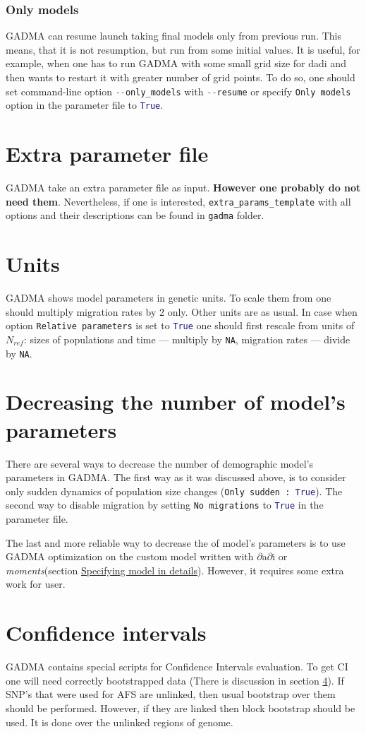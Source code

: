 \documentclass[12pt]{article}
\makeatletter
\newcommand{\dadi}{$\partial$a$\partial$i\xspace}
\newcommand{\moments}{\textit{moments}\xspace}
\newcommand{\py}[1]{\lstinline[language=Python, showstringspaces=False]@#1@}
\makeatother
\begin{document}
\subsubsection{Only models}
GADMA can resume launch taking final models only from previous run. This means, that it is not resumption, but run from some initial values. It is useful, for example, when one has to run GADMA with some small grid size for dadi and then wants to restart it with greater number of grid points. To do so, one should set command-line option \py{--only_models} with \py{--resume} or specify \py{Only models} option in the parameter file to \py{True}.

\section{Extra parameter file}
GADMA take an extra parameter file as input. \textbf{However one probably do not need them}. Nevertheless, if one is interested, \py{extra_params_template} with all options and their descriptions can be found in \py{gadma} folder.

\section{Units}
GADMA shows model parameters in genetic units. To scale them from one should multiply migration rates by 2 only. Other units are as usual. In case when option \py{Relative parameters} is set to \py{True} one should first rescale from units of $N_{ref}$: sizes of populations and time --- multiply by \py{NA}, migration rates --- divide by \py{NA}.

\section{Decreasing the number of model's parameters}
There are several ways to decrease the number of demographic model's parameters in GADMA. The first way as it was discussed above, is to consider only sudden dynamics of population size changes (\py{Only sudden : True}). The second way to disable migration by setting \py{No migrations} to \py{True} in the parameter file.

The last and more reliable way to decrease the of model's parameters is to use GADMA optimization on the custom model written with \dadi or \moments (section \hyperref[sec:spec-model-in-det]{Specifying model in details}). However, it requires some extra work for user.

\section{Confidence intervals}
GADMA contains special scripts for Confidence Intervals evaluation. To get CI one will need correctly bootstrapped data (There is discussion in section \ref{}). If SNP's that were used for AFS are unlinked, then usual bootstrap over them should be performed. However, if they are linked then block bootstrap should be used. It is done over the unlinked regions of genome.
\end{document}
